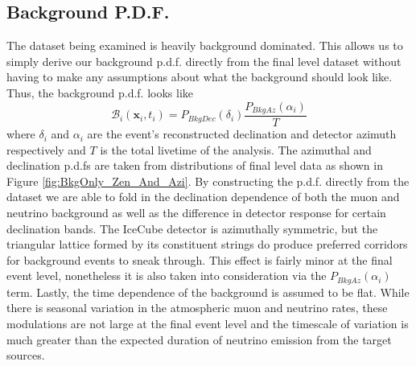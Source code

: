 \documentclass{gatech-thesis}
\begin{document}
\subsection{Background P.D.F.}
The dataset being examined is heavily background dominated. This allows us to simply derive our background p.d.f. directly from the final level dataset without having to make any assumptions about what the background should look like. Thus, the background p.d.f. looks like 
\begin{equation}
\mathcal{B}_i(\mathbf{x}_i,t_i) = P_{BkgDec}(\delta_i)\frac{P_{BkgAz}(\alpha_i)}{T}
\end{equation}
where $\delta_i$ and $\alpha_i$ are the event's reconstructed declination and detector azimuth respectively and $T$ is the total livetime of the analysis. The azimuthal and declination p.d.fs are taken from distributions of final level data as shown in Figure \ref{fig:BkgOnly_Zen_And_Azi}. By constructing the p.d.f. directly from the dataset we are able to fold in the declination dependence of both the muon and neutrino background as well as the difference in detector response for certain declination bands. The IceCube detector is azimuthally symmetric, but the triangular lattice formed by its constituent strings do produce preferred corridors for background events to sneak through. This effect is fairly minor at the final event level, nonetheless it is also taken into consideration via the $P_{BkgAz}(\alpha_i)$ term. Lastly, the time dependence of the background is assumed to be flat. While there is seasonal variation in the atmospheric muon and neutrino rates, these modulations are not large at the final event level and the timescale of variation is much greater than the expected duration of neutrino emission from the target sources.
\end{document}
